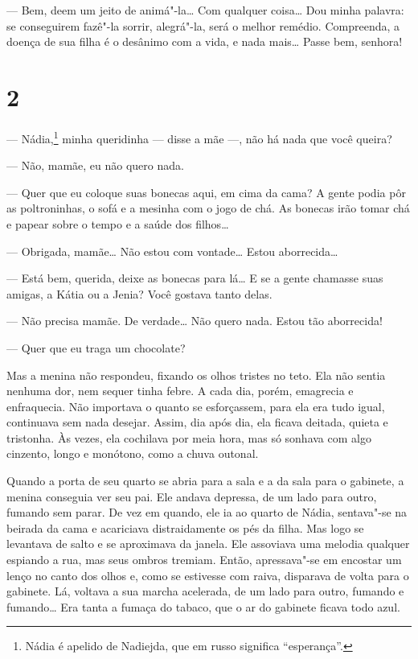 --- Bem, deem um jeito de animá"-la\ldots{} Com qualquer coisa\ldots{} Dou minha
palavra: se conseguirem fazê"-la sorrir, alegrá"-la, será o melhor
remédio. Compreenda, a doença de sua filha é o desânimo com a vida, e
nada mais\ldots{} Passe bem, senhora!

\section{2}

--- Nádia,\footnote{Nádia é apelido de Nadiejda, que em russo
  significa ``esperança''.} minha queridinha --- disse a mãe ---, não há
nada que você queira?

--- Não, mamãe, eu não quero nada.

--- Quer que eu coloque suas bonecas aqui, em cima da cama? A gente
podia pôr as poltroninhas, o sofá e a mesinha com o jogo de chá. As
bonecas irão tomar chá e papear sobre o tempo e a saúde dos filhos\ldots{}

--- Obrigada, mamãe\ldots{} Não estou com vontade\ldots{} Estou aborrecida\ldots{}

--- Está bem, querida, deixe as bonecas para lá\ldots{} E se a gente chamasse
suas amigas, a Kátia ou a Jenia? Você gostava tanto delas.

--- Não precisa mamãe. De verdade\ldots{} Não quero nada. Estou tão
aborrecida!

--- Quer que eu traga um chocolate?

Mas a menina não respondeu, fixando os olhos tristes no teto. Ela não
sentia nenhuma dor, nem sequer tinha febre. A cada dia, porém, emagrecia
e enfraquecia. Não importava o quanto se esforçassem, para ela era tudo
igual, continuava sem nada desejar. Assim, dia após dia, ela ficava
deitada, quieta e tristonha. Às vezes, ela cochilava por meia hora, mas
só sonhava com algo cinzento, longo e monótono, como a chuva outonal.

Quando a porta de seu quarto se abria para a sala e a da sala para o
gabinete, a menina conseguia ver seu pai. Ele andava depressa, de um
lado para outro, fumando sem parar. De vez em quando, ele ia ao quarto
de Nádia, sentava"-se na beirada da cama e acariciava distraidamente os
pés da filha. Mas logo se levantava de salto e se aproximava da janela.
Ele assoviava uma melodia qualquer espiando a rua, mas seus ombros
tremiam. Então, apressava"-se em encostar um lenço no canto dos olhos e,
como se estivesse com raiva, disparava de volta para o gabinete. Lá,
voltava a sua marcha acelerada, de um lado para outro, fumando e
fumando\ldots{} Era tanta a fumaça do tabaco, que o ar do gabinete ficava todo
azul.

